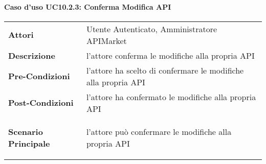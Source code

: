 \paragraph{Caso d'uso UC10.2.3: Conferma Modifica API}
\label{UC10.2.3}

\renewcommand*{\arraystretch}{1.6}
\begin{longtable}{ l | p{11cm}}
	\hline
	\rowcolor{Gray}
	\multicolumn{2}{c}{UC10.2.3: Conferma Modifica API} \\
	\hline
	\textbf{Attori} &Utente Autenticato, Amministratore APIMarket \\
	\textbf{Descrizione} &  l'attore conferma le modifiche alla propria API\\
	\textbf{Pre-Condizioni} & l'attore ha scelto di confermare le modifiche alla propria API\\
	\textbf{Post-Condizioni}& l'attore ha confermato le modifiche alla propria API\\
	\textbf{Scenario Principale} & \begin{enumerate*}[label=(\arabic*.),itemjoin={\newline}]
		\item l'attore può confermare le modifiche alla propria API
	\end{enumerate*}\\
\end{longtable}


